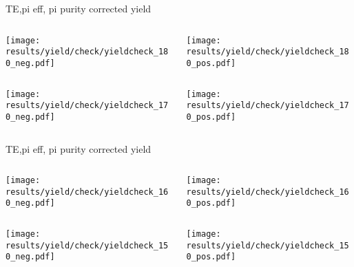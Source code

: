 \begin{frame}{TE,pi eff, pi purity corrected yield}
\begin{columns}
\begin{column}[T]{0.5\textwidth}
\texttt{[image: results/yield/check/yieldcheck\_180\_neg.pdf]}
\end{column}
\begin{column}[T]{0.5\textwidth}
\texttt{[image: results/yield/check/yieldcheck\_180\_pos.pdf]}
\end{column}
\end{columns}
\begin{columns}
\begin{column}[T]{0.5\textwidth}
\texttt{[image: results/yield/check/yieldcheck\_170\_neg.pdf]}
\end{column}
\begin{column}[T]{0.5\textwidth}
\texttt{[image: results/yield/check/yieldcheck\_170\_pos.pdf]}
\end{column}
\end{columns}
\end{frame}
\begin{frame}{TE,pi eff, pi purity corrected yield}
\begin{columns}
\begin{column}[T]{0.5\textwidth}
\texttt{[image: results/yield/check/yieldcheck\_160\_neg.pdf]}
\end{column}
\begin{column}[T]{0.5\textwidth}
\texttt{[image: results/yield/check/yieldcheck\_160\_pos.pdf]}
\end{column}
\end{columns}
\begin{columns}
\begin{column}[T]{0.5\textwidth}
\texttt{[image: results/yield/check/yieldcheck\_150\_neg.pdf]}
\end{column}
\begin{column}[T]{0.5\textwidth}
\texttt{[image: results/yield/check/yieldcheck\_150\_pos.pdf]}
\end{column}
\end{columns}
\end{frame}
